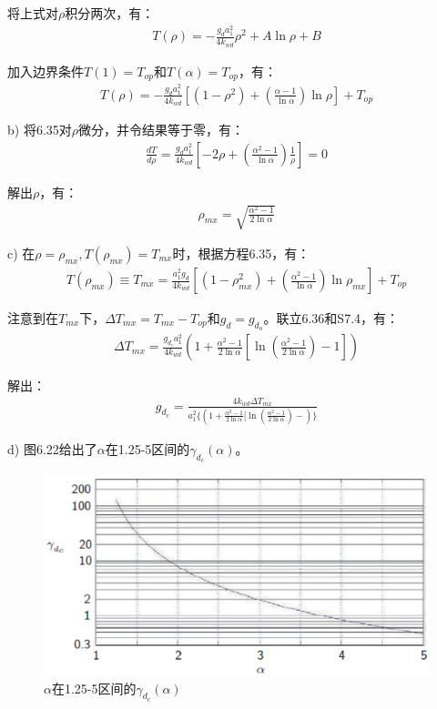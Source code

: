 将上式对$\rho$积分两次，有：
\begin{align*}%
T(\rho)=-\frac{g_da_1^2}{4k_{wd}}\rho^2+A\ln\rho+B \tag{S7.2}
\end{align*}

加入边界条件$T(1)=T_{op}$和$T(\alpha)=T_{op}$，有：
\begin{align*}%
T(\rho)=-\frac{g_da_1^2}{4k_{wd}}[(1-\rho^2)+(\frac{\alpha-1}{\ln\alpha})\ln\rho]+T_{op} \tag{6.35}
\end{align*}

b) 将6.35对$\rho$微分，并令结果等于零，有：
\begin{align*}%
\frac{dT}{d\rho}=\frac{g_da_1^2}{4k_{wd}}[-2\rho+(\frac{\alpha^2-1}{\ln\alpha})\frac{1}{\rho}]=0 \tag{S7.3}
\end{align*}

解出$\rho$，有：
\begin{align*}%
\rho_{mx}=\sqrt{\frac{\alpha^2-1}{2\ln\alpha}} \tag{6.36}
\end{align*}

c) 在$\rho=\rho_{mx},T(\rho_{mx})=T_{mx}$时，根据方程6.35，有：
\begin{align*}%
T(\rho_{mx})\equiv T_{mx}=\frac{a_1^2g_d}{4k_{wd}}[(1-\rho_{mx}^2)+(\frac{\alpha^2-1}{\ln\alpha})\ln\rho_{mx}]+T_{op} \tag{S7.4}
\end{align*}

注意到在$T_{mx}$下，$\Delta T_{mx}=T_{mx}-T_{op}$和$g_d=g_{d_o}$。联立6.36和S7.4，有：
\begin{align*}%
\Delta T_{mx}=\frac{g_{d_c}a_1^2}{4k_{wd}}(1+\frac{\alpha^2-1}{2\ln\alpha}[\ln(\frac{\alpha^2-1}{2\ln\alpha})-1]) \tag{S7.5}
\end{align*}

解出：
\begin{align*}%
g_{d_c}=\frac{4k_{wd}\Delta T_{mx}}{a_1^2\{(1+\frac{\alpha^2-1}{2\ln\alpha}[\ln(\frac{\alpha^2-1}{2\ln\alpha})-)\}} \tag{6.37}
\end{align*}

d) 图6.22给出了$\alpha$在1.25-5区间的$\gamma_{d_c}(\alpha)$。
\begin{figure}[htbp]
	\centering
	\includegraphics[scale=0.7]{chpt6/figs/fig6.22.eps}
	\caption{$\alpha$在1.25-5区间的$\gamma_{d_c}(\alpha)$}
\end{figure}

